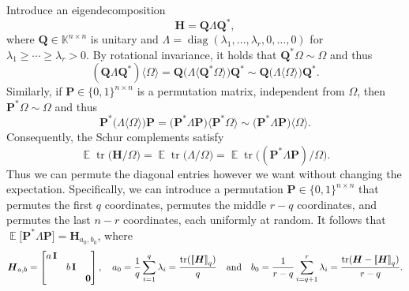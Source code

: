 \documentclass[11pt]{article}
\newcommand{\field}{\mathbb{K}}
\DeclareMathOperator{\tr}{tr}
\DeclareMathOperator{\diag}{diag}
\newcommand{\mat}[1]{\boldsymbol{#1}}
\newcommand{\lowrank}[1]{%
  \mleft[\!\mleft[ #1 \mright]\!\mright]}
\newcommand{\Id}{\mathbf{I}}
\DeclareMathOperator{\expect}{\mathbb{E}}
\theoremstyle{definition}
\numberwithin{equation}{section}
\begin{document}
Introduce an eigendecomposition
\begin{equation*}
    \mat{H} = \mat{Q} \mat{\varLambda} \mat{Q}^*,
\end{equation*}
where $\mat{Q} \in \field^{n \times n}$ is unitary and $\mat{\varLambda} = \diag(\lambda_1,\ldots,\lambda_r,0,\ldots,0)$ for $\lambda_1 \geq \cdots \geq \lambda_r > 0$.
By rotational invariance, it holds that $\mat{Q}^* \mat{\varOmega} \sim \mat{\varOmega}$ and thus
\begin{equation*}
    (\mat{Q} \mat{\varLambda} \mat{Q}^*)\langle \mat{\varOmega} \rangle
    = \mat{Q} \bigl(\mat{\varLambda}\langle \mat{Q}^*\mat{\varOmega}\rangle\bigr) \mat{Q}^*
    \sim \mat{Q} \bigl(\mat{\varLambda}\langle \mat{\varOmega} \rangle\bigr) \mat{Q}^*.
\end{equation*}
Similarly, if $\mat{P} \in \{0, 1\}^{n \times n}$ is a permutation matrix, independent from $\mat{\varOmega}$, then $\mat{P}^* \mat{\varOmega} \sim \mat{\varOmega}$ and thus
\begin{equation*}
    \mat{P}^* \bigl(\mat{\varLambda}\langle \mat{\varOmega} \rangle \bigr) \mat{P}
    = \bigl(\mat{P}^* \mat{\varLambda} \mat{P}\bigr) \langle \mat{P}^* \mat{\varOmega} \rangle
    \sim \bigl(\mat{P}^* \mat{\varLambda} \mat{P}\bigr) \langle \mat{\varOmega} \rangle.
\end{equation*}
Consequently, the Schur complements satisfy
\begin{equation*}
    \expect \tr\bigl(\mat{H} / \mat{\varOmega} \bigr)
    = \expect \tr\bigl(\mat{\varLambda} / \mat{\varOmega} \bigr)
    = \expect \tr\bigl((\mat{P}^* \mat{\varLambda} \mat{P})
    / \mat{\varOmega}\bigr).
\end{equation*}
Thus we can permute the diagonal entries however we want without changing the expectation.
Specifically, we can introduce a permutation $\mat{P} \in \{0, 1\}^{n \times n}$ that permutes the first $q$ coordinates, permutes the middle $r-q$ coordinates, and permutes the last $n - r$ coordinates, each uniformly at random.
It follows that $\expect \bigl[\mat{P}^* \mat{\varLambda} \mat{P}\bigr] = \mat{H}_{a_0, b_0}$, where
\begin{equation*}
    \mat{H}_{a,b}
    = \begin{bmatrix}
        a\,\Id & & \\
        & b\,\Id & \\
        & & \mat{0}
    \end{bmatrix},
    \quad
    a_0 = \frac{1}{q} \sum_{i=1}^q \lambda_i = \frac{\tr(\lowrank{\mat{H}}_q)}{q} 
    \quad \text{and}
    \quad
    b_0
    = \frac{1}{r-q} \sum_{i=q+1}^r \lambda_i
    = \frac{\tr(\mat{H} - \lowrank{\mat{H}}_q)}{r-q}.
\end{equation*}
\end{document}
